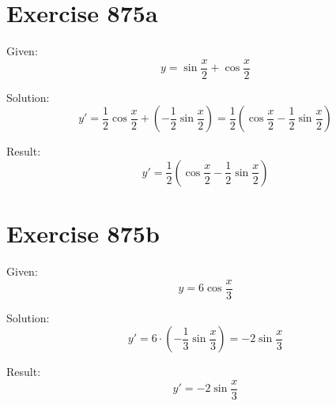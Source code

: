 \documentclass[a4paper, 10pt]{scrartcl}
\begin{document}
\section{Exercise 875a}

Given:
\[
y = \sin{\frac{x}{2}} + \cos{\frac{x}{2}}
\]

Solution:
\[
y' = \frac{1}{2}\cos{\frac{x}{2}} + (-\frac{1}{2}\sin{\frac{x}{2}}) = \frac{1}{2}(\cos{\frac{x}{2}} - \frac{1}{2}\sin{\frac{x}{2}})
\]

Result:
\[
y' = \frac{1}{2}(\cos{\frac{x}{2}} - \frac{1}{2}\sin{\frac{x}{2}})
\]

\section{Exercise 875b}

Given:
\[
y = 6\cos{\frac{x}{3}}
\]

Solution:
\[
y' = 6\cdot(-\frac{1}{3}\sin{\frac{x}{3}}) = -2\sin{\frac{x}{3}}
\]

Result:
\[
y' = -2\sin{\frac{x}{3}}
\]
\end{document}
